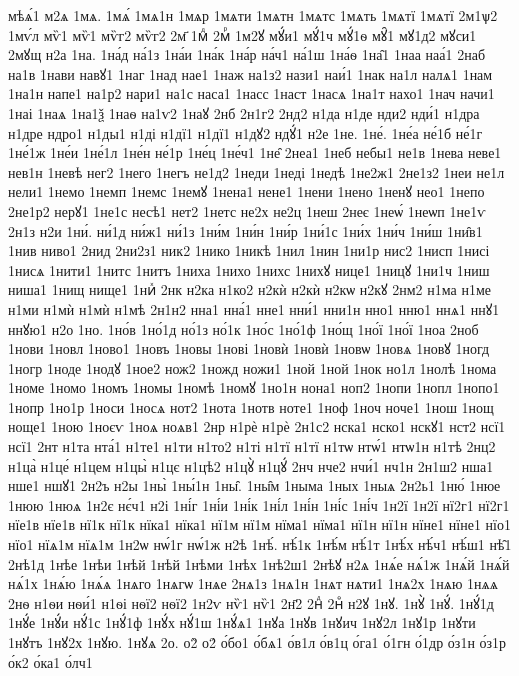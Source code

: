 {мѣѧ́1
м2ѧ
1мѧ.
1мѧ́
1мѧ1н
1мѧр
1мѧти
1мѧтн
1мѧтс
1мѧть
1мѧтї
1мѧтї
2м1ѱ2
1мѵ́л
мѷ1
мѷ1
мѷг2
мѷг2
2м҃
1мⷣ
2мⷬ
1м2ꙋ
мꙋ́и1
мꙋ́1ч
мꙋ́1ѳ
мꙋ̑1
мꙋ1д2
мꙋси1
2мꙋщ
н2а
1на.
1на́д
на́1з
1на́и
1на́к
1на́р
на́ч1
на́1ш
1на́ѳ
1на̑1
1наа
наа́1
2наб
на1в
1нави
навꙋ1
1наг
1над
нае1
1наж
на1з2
нази1
наи́1
1нак
на1л
налѧ1
1нам
1на1н
напе1
на1р2
нари1
на1с
наса1
1насс
1наст
1насѧ
1на1т
нахо1
1нач
начи1
1наі
1наѧ
1на1ѯ
1наѳ
на1ѵ2
1наꙋ
2нб
2н1г2
2нд2
н1да
н1де
нди2
нди́1
н1дра
н1дре
ндро1
н1ды1
н1ді
н1дї1
н1дї1
н1дꙋ2
ндꙋ́1
н2е
1не.
1не́.
1не́а
не́1б
не́1г
1не́1ж
1не́и
1не́1л
1не́н
не́1р
1не́ц
1не́ч1
1не̑
2неа1
1неб
небы1
не1в
1нева
неве1
нев1н
1невѣ
нег2
1него
1негъ
не1д2
1неди
1неді
1недѣ
1не2ж1
2не1з2
1неи
не1л
нели1
1немо
1немп
1немс
1немꙋ
1нена1
нене1
1нени
1нено
1ненꙋ
нео1
1непо
2не1р2
нерꙋ1
1не1с
несѣ1
нет2
1нетс
не2х
не2ц
1неш
2неє
1неѡ́
1неѡп
1не1ѵ
2н1з
н2и
1ни́.
ни́1д
ни́ж1
ни́1з
1ни́м
1ни́н
1ни́р
1ни́1с
1ни́х
1ни́ч
1ни́ш
1ни̑в1
1нив
ниво1
2нид
2ни2з1
ник2
1нико
1никѣ
1нил
1нин
1ни1р
нис2
1нисп
1нисі
1нисѧ
1нити1
1нитс
1нитъ
1ниха
1нихо
1нихс
1нихꙋ
нице1
1ницꙋ
1ни1ч
1ниш
ниша1
1нищ
нище1
1ниⷯ
2нк
н2ка
н1ко2
н2кѝ
н2кѝ
н2кѡ
н2кꙋ
2нм2
н1ма
н1ме
н1ми
н1мѝ
н1мѝ
н1мѣ
2н1н2
нна1
нна́1
нне1
нни́1
нни1н
нно1
нню1
ннѧ1
ннꙋ1
ннꙋю1
н2о
1но.
1но́в
1но́1д
но́1з
но́1к
1но́с
1но́1ф
1но́щ
1но́ї
1но́ї
1ноа
2ноб
1нови
1новл
1ново1
1новъ
1новы
1нові
1новѝ
1новѝ
1новѡ
1новѧ
1новꙋ
1ногд
1ногр
1ноде
1нодꙋ
1ное2
нож2
1ножд
ножи1
1ной
1ной
1нок
но1л
1нолѣ
1нома
1номе
1номо
1номъ
1номы
1номѣ
1номꙋ
1но1н
нона1
ноп2
1нопи
1нопл
1нопо1
1нопр
1но1р
1носи
1носѧ
нот2
1нота
1нотв
ноте1
1ноф
1ноч
ноче1
1нош
1нощ
ноще1
1ною
1ноєѵ
1ноѧ
ноѧв1
2нр
н1рѐ
н1рѐ
2н1с2
нска1
нско1
нскꙋ1
нст2
нсї1
нсї1
2нт
н1та
нта́1
н1те1
н1ти
н1то2
н1ті
н1тї
н1тї
н1тѡ
нтѡ́1
нтѡ1н
н1тѣ
2нц2
н1ца̀
н1це́
н1цем
н1цы̀
н1цє
н1цѣ2
н1цꙋ̀
н1цꙋ́
2нч
нче2
нчи́1
нч1н
2н1ш2
нша1
нше1
ншꙋ1
2н2ъ
н2ы
1ны̀
1ны́1н
1ны̑.
1ны̑м
1ныма
1ных
1ныѧ
2н2ь1
1ню́
1нюе
1нюю
1нюѧ
1н2є
нє́ч1
н2і
1ні́г
1ні́и
1ні́к
1ні́л
1ні́н
1ні́с
1ні́ч
1н2ї
1н2ї
нї2г1
нї2г1
нїе1в
нїе1в
нї1к
нї1к
нїка1
нїка1
нї1м
нї1м
нїма1
нїма1
нї1н
нї1н
нїне1
нїне1
нїо1
нїо1
нїѧ1м
нїѧ1м
1н2ѡ
нѡ́1г
нѡ́1ж
н2ѣ
1нѣ́.
нѣ́1к
1нѣ́м
нѣ́1т
1нѣ́х
нѣ́ч1
нѣ́ш1
нѣ̑1
2нѣ1д
1нѣе
1нѣи
1нѣй
1нѣй
1нѣми
1нѣх
1нѣ2ш1
2нѣꙋ
н2ѧ
1нѧ́е
нѧ́1ж
1нѧ́й
1нѧ́й
нѧ́1х
1нѧ́ю
1нѧ́ѧ
1нѧго
1нѧгѡ
1нѧе
2нѧ1з
1нѧ1н
1нѧт
нѧти1
1нѧ2х
1нѧю
1нѧѧ
2нѳ
н1ѳи
нѳи́1
н1ѳі
нѳї2
нѳї2
1н2ѵ
нѷ1
нѷ1
2н҃2
2нⷣ
2нⷴ
н2ꙋ
1нꙋ.
1нꙋ̀
1нꙋ́.
1нꙋ́1д
1нꙋ́е
1нꙋ́и
нꙋ́1с
1нꙋ́1ф
1нꙋ́х
нꙋ́1ш
1нꙋ́ѧ1
1нꙋа
1нꙋв
1нꙋич
1нꙋ2л
1нꙋ1р
1нꙋти
1нꙋтъ
1нꙋ2х
1нꙋю.
1нꙋѧ
2о.
о2̀
о2́
о́бо1
о́бѧ1
о́в1л
о́в1ц
о́га1
о́1гн
о́1др
о́з1н
о́з1р
о́к2
о́ка1
о́лч1
}
